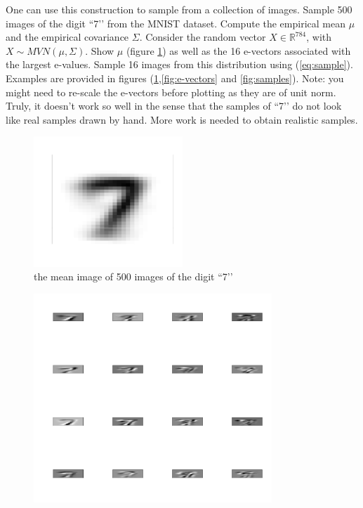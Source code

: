 \documentclass{article}[12pt]
\begin{document}
\begin{enumerate}
One can use this construction to sample from a collection of images. Sample 500 images of the digit ``7\rq\rq{} from the MNIST dataset. Compute the empirical mean $\mu$ and the empirical covariance $\Sigma$. Consider the random vector $X \in \mathbb{R}^{784}$, with $X \sim MVN (\mu,\Sigma)$. Show $\mu$ (figure \ref{fig:mu}) as well as the 16 e-vectors associated with the largest e-values.  Sample 16 images from this distribution using (\ref{eq:sample}). Examples are provided in figures (\ref{fig:mu},\ref{fig:e-vectors} and \ref{fig:samples}). Note: you might need to re-scale the e-vectors before plotting as they are of unit norm.  Truly, it doesn\rq{}t work so well in the sense that the samples of ``7\rq\rq{} do not look like real samples drawn by hand. More work is needed to obtain realistic samples. 
 \begin{figure}
\includegraphics[width=0.5\textwidth]{mu.pdf}
\caption{\label{fig:mu}the mean image of 500 images of the digit ``7\rq\rq{}}
\end{figure}
\begin{figure}
\includegraphics[width=0.8\textwidth]{e-vectors.pdf}

\end{figure}
\end{enumerate}
\end{document}
